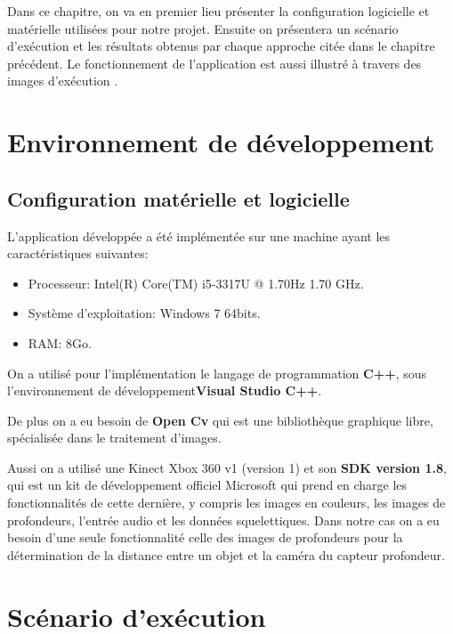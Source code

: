 \documentclass[12pt,a4paper,oneside]{book}
\begin{document}
	Dans ce chapitre, on va en premier lieu présenter la  configuration logicielle et matérielle utilisées pour notre projet. Ensuite on présentera un scénario d'exécution et les résultats obtenus par chaque approche citée dans le chapitre précédent. Le fonctionnement de l'application est aussi illustré à travers des images d'exécution .
	
	
	\section{Environnement de développement}
	
	\subsection{Configuration matérielle et logicielle}
	
	L'application développée a été implémentée sur une machine ayant les caractéristiques suivantes:
	
	\begin{itemize}
		\item Processeur: Intel(R) Core(TM) i5-3317U @ 1.70Hz 1.70 GHz.
		\item Système d'exploitation: Windows 7 64bits.
		\item RAM: 8Go.
	\end{itemize}
	
	On a utilisé pour l'implémentation le langage de programmation \textbf{C++}, sous l’environnement de développement\textbf{Visual Studio C++}.
	
	De plus on a eu besoin de \textbf{Open Cv} qui est une bibliothèque graphique libre, spécialisée dans le traitement d'images.
	
	Aussi on a utilisé une Kinect Xbox 360  v1 (version 1) et son \textbf{SDK version 1.8}, qui est un kit de développement officiel Microsoft qui prend en charge les fonctionnalités de cette dernière, y compris les images en couleurs, les images de profondeurs, l'entrée audio et les données squelettiques.
	Dans notre cas on a eu besoin d'une seule fonctionnalité celle  des images de profondeurs  pour la détermination de la distance entre un objet et la caméra du capteur profondeur.
	
	
	\section{Scénario d'exécution}
	
\end{document}
